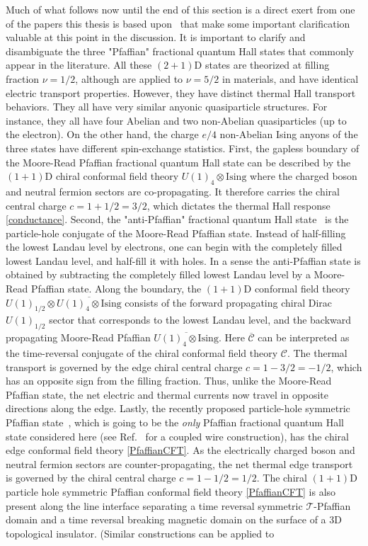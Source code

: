 Much of what follows now until the end of this section is a direct exert from one of the papers this thesis is based upon~\cite{RazaSirotaTeo17} that make some important clarification valuable at this point in the discussion. It is important to clarify and disambiguate the three "Pfaffian" fractional quantum Hall states that commonly appear in the literature. All these $(2+1)$D states are theorized at filling fraction $\nu=1/2$, although are applied to $\nu=5/2$ in materials, and have identical electric transport properties. However, they have distinct thermal Hall transport behaviors. They all have very similar anyonic quasiparticle structures. For instance, they all have four Abelian and two non-Abelian quasiparticles (up to the electron). On the other hand, the charge $e/4$ non-Abelian Ising anyons of the three states have different spin-exchange statistics. First, the gapless boundary of the Moore-Read Pfaffian fractional quantum Hall state can be described by the $(1+1)$D chiral conformal field theory $U(1)_4\otimes\mathrm{Ising}$ where the charged boson and neutral fermion sectors are co-propagating. It therefore carries the chiral central charge $c=1+1/2=3/2$, which dictates the thermal Hall response \eqref{conductance}. Second, the "anti-Pfaffian" fractional quantum Hall state~\cite{LevinHalperinRosenow07,LeeRyuNayakFisher07} is the particle-hole conjugate of the Moore-Read Pfaffian state. Instead of half-filling the lowest Landau level by electrons, one can begin with the completely filled lowest Landau level, and half-fill it with holes. In a sense the anti-Pfaffian state is obtained by subtracting the completely filled lowest Landau level by a Moore-Read Pfaffian state. Along the boundary, the $(1+1)$D conformal field theory $U(1)_{1/2}\otimes\overline{U(1)_4\otimes\mathrm{Ising}}$ consists of the forward propagating chiral Dirac $U(1)_{1/2}$ sector that corresponds to the lowest Landau level, and the backward propagating Moore-Read Pfaffian $\overline{U(1)_4\otimes\mathrm{Ising}}$. Here $\overline{\mathcal{C}}$ can be interpreted as the time-reversal conjugate of the chiral conformal field theory $\mathcal{C}$. The thermal transport is governed by the edge chiral central charge $c=1-3/2=-1/2$, which has an opposite sign from the filling fraction. Thus, unlike the Moore-Read Pfaffian state, the net electric and thermal currents now travel in opposite directions along the edge. Lastly, the recently proposed particle-hole symmetric Pfaffian state~\cite{Son15,BarkeshliMulliganFisher15,WangSenthil16}, which is going to be the {\em only} Pfaffian fractional quantum Hall state considered here (see Ref.~ for a coupled wire construction), has the chiral edge conformal field theory \eqref{PfaffianCFT}. As the electrically charged boson and neutral fermion sectors are counter-propagating, the net thermal edge transport is governed by the chiral central charge $c=1-1/2=1/2$. The chiral $(1+1)$D particle hole symmetric Pfaffian conformal field theory \eqref{PfaffianCFT} is also present along the line interface separating a time reversal symmetric $\mathcal{T}$-Pfaffian~\cite{ChenFidkowskiVishwanath14} domain and a time reversal breaking magnetic domain on the surface of a 3D topological insulator. (Similar constructions can be applied to 